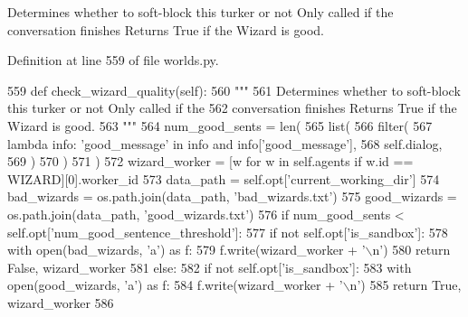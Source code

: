 \begin{DoxyVerb}Determines whether to soft-block this turker or not Only called if the
conversation finishes Returns True if the Wizard is good.
\end{DoxyVerb}
 

Definition at line 559 of file worlds.\+py.


\begin{DoxyCode}
559     \textcolor{keyword}{def }check\_wizard\_quality(self):
560         \textcolor{stringliteral}{"""}
561 \textcolor{stringliteral}{        Determines whether to soft-block this turker or not Only called if the}
562 \textcolor{stringliteral}{        conversation finishes Returns True if the Wizard is good.}
563 \textcolor{stringliteral}{        """}
564         num\_good\_sents = len(
565             list(
566                 filter(
567                     \textcolor{keyword}{lambda} info: \textcolor{stringliteral}{'good\_message'} \textcolor{keywordflow}{in} info \textcolor{keywordflow}{and} info[\textcolor{stringliteral}{'good\_message'}],
568                     self.dialog,
569                 )
570             )
571         )
572         wizard\_worker = [w \textcolor{keywordflow}{for} w \textcolor{keywordflow}{in} self.agents \textcolor{keywordflow}{if} w.id == WIZARD][0].worker\_id
573         data\_path = self.opt[\textcolor{stringliteral}{'current\_working\_dir'}]
574         bad\_wizards = os.path.join(data\_path, \textcolor{stringliteral}{'bad\_wizards.txt'})
575         good\_wizards = os.path.join(data\_path, \textcolor{stringliteral}{'good\_wizards.txt'})
576         \textcolor{keywordflow}{if} num\_good\_sents < self.opt[\textcolor{stringliteral}{'num\_good\_sentence\_threshold'}]:
577             \textcolor{keywordflow}{if} \textcolor{keywordflow}{not} self.opt[\textcolor{stringliteral}{'is\_sandbox'}]:
578                 with open(bad\_wizards, \textcolor{stringliteral}{'a'}) \textcolor{keyword}{as} f:
579                     f.write(wizard\_worker + \textcolor{stringliteral}{'\(\backslash\)n'})
580             \textcolor{keywordflow}{return} \textcolor{keyword}{False}, wizard\_worker
581         \textcolor{keywordflow}{else}:
582             \textcolor{keywordflow}{if} \textcolor{keywordflow}{not} self.opt[\textcolor{stringliteral}{'is\_sandbox'}]:
583                 with open(good\_wizards, \textcolor{stringliteral}{'a'}) \textcolor{keyword}{as} f:
584                     f.write(wizard\_worker + \textcolor{stringliteral}{'\(\backslash\)n'})
585             \textcolor{keywordflow}{return} \textcolor{keyword}{True}, wizard\_worker
586 
\end{DoxyCode}
